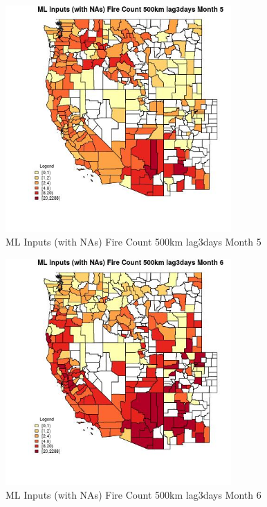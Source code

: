 \begin{figure} 
\centering  
\includegraphics[width=0.77\textwidth]{Code_Outputs/Report_ML_input_PM25_Step4_part_e_de_duplicated_aves_compiled_2019-05-20wNAs_CountyFire_Count_500km_lag3daysmedianMonth5.jpg} 
\caption{\label{fig:Report_ML_input_PM25_Step4_part_e_de_duplicated_aves_compiled_2019-05-20wNAsCountyFire_Count_500km_lag3daysmedianMonth5}ML Inputs (with NAs) Fire Count 500km lag3days Month 5} 
\end{figure} 
 

\begin{figure} 
\centering  
\includegraphics[width=0.77\textwidth]{Code_Outputs/Report_ML_input_PM25_Step4_part_e_de_duplicated_aves_compiled_2019-05-20wNAs_CountyFire_Count_500km_lag3daysmedianMonth6.jpg} 
\caption{\label{fig:Report_ML_input_PM25_Step4_part_e_de_duplicated_aves_compiled_2019-05-20wNAsCountyFire_Count_500km_lag3daysmedianMonth6}ML Inputs (with NAs) Fire Count 500km lag3days Month 6} 
\end{figure} 
 

